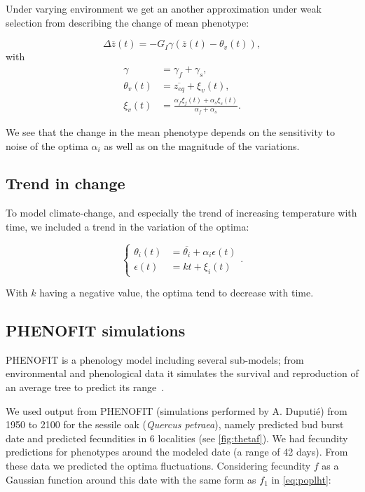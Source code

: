 Under varying environment we get an another approximation under weak selection from \citep{engen_evolution_2011} describing the change of mean phenotype:

\begin{equation}
	\label{eq:zfluct}
	\Delta \overline{z}(t) = - G_I \gamma (\overline{z}(t) - \theta_v(t)),
\end{equation}
with
\begin{subequations}
	\begin{align}
		\gamma &= \gamma_f + \gamma_s, \\
		\theta_v(t) &= \overline{z_{eq}} + \xi_v(t), \\
		\xi_v(t) &= \frac{\alpha_f \xi_f(t) + \alpha_s \xi_s(t)}{\alpha_f + \alpha_s}.
	\end{align}
\end{subequations}

We see that the change in the mean phenotype depends on the sensitivity to noise of the optima $\alpha_i$ as well as on the magnitude of the variations.

\subsection*{Trend in change}

To model climate-change, and especially the trend of increasing temperature with time, we included a trend in the variation of the optima:

\begin{equation}
	\label{eq:kt}
	\left\{
	\begin{aligned}
		\theta_i(t) &= \overline{\theta_i} + \alpha_i\epsilon(t) \\
		\epsilon(t) &= kt + \xi_i(t)
	\end{aligned}
	\right..
\end{equation}

With $k$ having a negative value, the optima tend to decrease with time.

\subsection*{\textsc{PHENOFIT} simulations}

\textsc{PHENOFIT} is a phenology model including several sub-models; from environmental and phenological data it simulates the survival and reproduction of an average tree to predict its range~\citep{morin_tree_2008}.

 We used output from \textsc{PHENOFIT} (simulations performed by A. Duputié) from 1950 to 2100 for the sessile oak (\textit{Quercus petraea}), namely predicted bud burst date and predicted fecundities in 6 localities (see \autoref{fig:thetaf}). We had fecundity predictions for phenotypes around the modeled date (a range of 42 days). From these data we predicted the optima fluctuations. Considering fecundity $f$ as a Gaussian function around this date with the same form as $f_1$ in \autoref{eq:poplht}:


